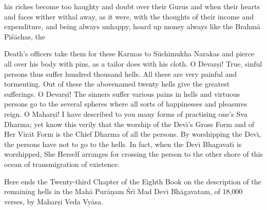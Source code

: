 his riches become too haughty and doubt over their Gurus and when their hearts and faces wither withal away, as it were, with the thoughts of their income and expenditure, and being always unhappy, hoard up money always like the Brahm\=a Pi\'s\=achas, the

Death's officers take them for these Karmas to S\=uchimukha Narakas and pierce all over his body with pins, as a tailor does with his cloth. O Devar\d{s}i! True, sinful persons thus suffer hundred thousand hells. All these are very painful and tormenting. Out of these the abovenamed twenty hells give the greatest sufferings. O Devar\d{s}i! The sinners suffer various pains in hells and virtuous persons go to the several spheres where all sorts of happinesses and pleasures reign. O Mahar\d{s}i! I have described to you many forms of practising one's Sva Dharma; yet know this verily that the worship of the Dev\={\i}'s Gross Form and of Her Vir\=at Form is the Chief Dharma of all the persons. By worshipping the Dev\={\i}, the persons have not to go to the hells. In fact, when the Dev\={\i} Bhagavat\={\i} is worshipped, She Herself arranges for crossing the person to the other shore of this ocean of transmigration of existence.

Here ends the Twenty-third Chapter of the Eighth Book on the description of the remaining hells in the Mah\=a Pur\=a\d{n}am \'Sr\={\i} Mad Dev\={\i} Bh\=agavatam, of 18,000 verses, by Mahar\d{s}i Veda Vy\=asa.



